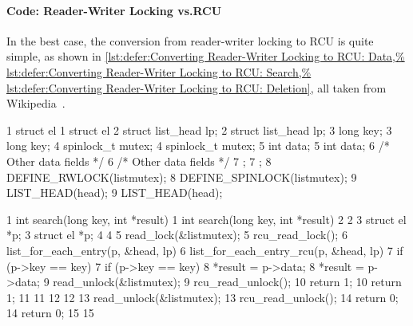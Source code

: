 \paragraph{Code:
		 Reader-Writer Locking vs.\@ RCU}

In the best case, the conversion from reader-writer locking to RCU
is quite simple, as shown in
\cref{lst:defer:Converting Reader-Writer Locking to RCU: Data,%
lst:defer:Converting Reader-Writer Locking to RCU: Search,%
lst:defer:Converting Reader-Writer Locking to RCU: Deletion},
all taken from
Wikipedia~\cite{WikipediaRCU}.

\begin{listing*}
{ \scriptsize
\begin{verbbox}
 1 struct el {                           1 struct el {
 2   struct list_head lp;                2   struct list_head lp;
 3   long key;                           3   long key;
 4   spinlock_t mutex;                   4   spinlock_t mutex;
 5   int data;                           5   int data;
 6   /* Other data fields */             6   /* Other data fields */
 7 };                                    7 };
 8 DEFINE_RWLOCK(listmutex);             8 DEFINE_SPINLOCK(listmutex);
 9 LIST_HEAD(head);                      9 LIST_HEAD(head);
\end{verbbox}
}
\hspace*{0.9in}\OneColumnHSpace{-0.5in}
\IfEbookSize{\hspace*{-1.05in}}{}\theverbbox
\caption{Converting Reader-Writer Locking to RCU\@:
						    Data}
\label{lst:defer:Converting Reader-Writer Locking to RCU: Data}
\end{listing*}

\begin{listing*}
{ \scriptsize
\begin{verbbox}
 1 int search(long key, int *result)     1 int search(long key, int *result)
 2 {                                     2 {
 3   struct el *p;                       3   struct el *p;
 4                                       4
 5   read_lock(&listmutex);              5   rcu_read_lock();
 6   list_for_each_entry(p, &head, lp) { 6   list_for_each_entry_rcu(p, &head, lp) {
 7     if (p->key == key) {              7     if (p->key == key) {
 8       *result = p->data;              8       *result = p->data;
 9       read_unlock(&listmutex);        9       rcu_read_unlock();
10       return 1;                      10       return 1;
11     }                                11     }
12   }                                  12   }
13   read_unlock(&listmutex);           13   rcu_read_unlock();
14   return 0;                          14   return 0;
15 }                                    15 }
\end{verbbox}
}
\hspace*{0.9in}\OneColumnHSpace{-0.5in}
\IfEbookSize{\hspace*{-1.05in}}{}\theverbbox
\caption{Converting Reader-Writer Locking to RCU\@:
						    Search}
\label{lst:defer:Converting Reader-Writer Locking to RCU: Search}
\end{listing*}


